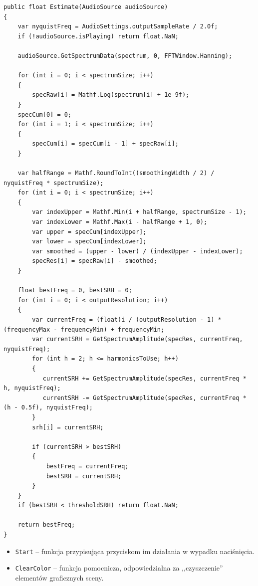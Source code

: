 \begin{lstlisting}[style=sharpcstyle,caption=Funkcja \texttt{Estimate}, label=lst:1]
public float Estimate(AudioSource audioSource)
{
    var nyquistFreq = AudioSettings.outputSampleRate / 2.0f;
    if (!audioSource.isPlaying) return float.NaN;

    audioSource.GetSpectrumData(spectrum, 0, FFTWindow.Hanning);

    for (int i = 0; i < spectrumSize; i++)
    {       
        specRaw[i] = Mathf.Log(spectrum[i] + 1e-9f);
    }
    specCum[0] = 0;
    for (int i = 1; i < spectrumSize; i++)
    {
        specCum[i] = specCum[i - 1] + specRaw[i];
    }

    var halfRange = Mathf.RoundToInt((smoothingWidth / 2) / nyquistFreq * spectrumSize);
    for (int i = 0; i < spectrumSize; i++)
    {    
        var indexUpper = Mathf.Min(i + halfRange, spectrumSize - 1);
        var indexLower = Mathf.Max(i - halfRange + 1, 0);
        var upper = specCum[indexUpper];
        var lower = specCum[indexLower];
        var smoothed = (upper - lower) / (indexUpper - indexLower);        
        specRes[i] = specRaw[i] - smoothed;
    }

    float bestFreq = 0, bestSRH = 0;
    for (int i = 0; i < outputResolution; i++)
    {
        var currentFreq = (float)i / (outputResolution - 1) * (frequencyMax - frequencyMin) + frequencyMin;       
        var currentSRH = GetSpectrumAmplitude(specRes, currentFreq, nyquistFreq);
        for (int h = 2; h <= harmonicsToUse; h++)
        {
           currentSRH += GetSpectrumAmplitude(specRes, currentFreq * h, nyquistFreq);
           currentSRH -= GetSpectrumAmplitude(specRes, currentFreq * (h - 0.5f), nyquistFreq);
        }
        srh[i] = currentSRH;
       
        if (currentSRH > bestSRH)
        {
            bestFreq = currentFreq;
            bestSRH = currentSRH;
        }
    }    
    if (bestSRH < thresholdSRH) return float.NaN;

    return bestFreq;
}
\end{lstlisting}

\begin{itemize}
    \item \texttt{Start} -- funkcja przypisująca przyciskom im działania w wypadku naciśnięcia.
    \item \texttt{ClearColor} -- funkcja pomocnicza, odpowiedzialna za ,,czyszczenie'' elementów graficznych sceny.
\end{itemize}

